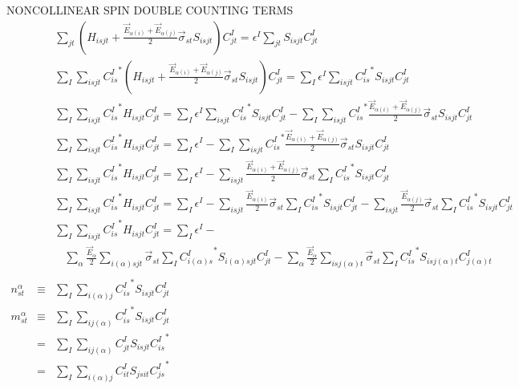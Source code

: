 \documentclass{article}
\begin{document}
NONCOLLINEAR SPIN DOUBLE COUNTING TERMS
\begin{eqnarray*}
&&  \sum_{jt} \left( H_{isjt} +
    \frac{\vec{E}_{\alpha(i)} + \vec{E}_{\alpha(j)} }{2} \vec{\sigma}_{st} S_{isjt} \right) {C^I_{jt}} = 
    \epsilon^I \sum_{jt} S_{isjt} {C^I_{jt}} \\
&&  \sum_I \sum_{isjt} {C^I_{is}}^* \left( H_{isjt} +
    \frac{\vec{E}_{\alpha(i)} + \vec{E}_{\alpha(j)} }{2} \vec{\sigma}_{st} S_{isjt} \right) {C^I_{jt}} = 
    \sum_I \epsilon^I \sum_{isjt} {C^I_{is}}^* S_{isjt} {C^I_{jt}} \\
&&  \sum_I \sum_{isjt} {C^I_{is}}^* H_{isjt} C^I_{jt} =
    \sum_I \epsilon^I \sum_{isjt} {C^I_{is}}^* S_{isjt} {C^I_{jt}} - 
    \sum_I \sum_{isjt} {C^I_{is}}^* \frac{\vec{E}_{\alpha(i)} + \vec{E}_{\alpha(j)} }{2} \vec{\sigma}_{st} S_{isjt} {C^I_{jt}} \\
&& \sum_I \sum_{isjt} {C^I_{is}}^* H_{isjt} C^I_{jt} =
    \sum_I \epsilon^I -
    \sum_I \sum_{isjt} {C^I_{is}}^* \frac{\vec{E}_{\alpha(i)} + \vec{E}_{\alpha(j)} }{2} \vec{\sigma}_{st} S_{isjt} {C^I_{jt}} \\
&& \sum_I \sum_{isjt} {C^I_{is}}^* H_{isjt} C^I_{jt} =
    \sum_I \epsilon^I -
    \sum_{isjt} \frac{\vec{E}_{\alpha(i)} + \vec{E}_{\alpha(j)} }{2} \vec{\sigma}_{st} \sum_I {C^I_{is}}^* S_{isjt} {C^I_{jt}} \\
&& \sum_I \sum_{isjt} {C^I_{is}}^* H_{isjt} C^I_{jt} =
    \sum_I \epsilon^I -
    \sum_{isjt} \frac{\vec{E}_{\alpha(i)}}{2} \vec{\sigma}_{st} \sum_I {C^I_{is}}^* S_{isjt} {C^I_{jt}} -
    \sum_{isjt} \frac{\vec{E}_{\alpha(j)}}{2} \vec{\sigma}_{st} \sum_I {C^I_{is}}^* S_{isjt} {C^I_{jt}} \\
&& \sum_I \sum_{isjt} {C^I_{is}}^* H_{isjt} C^I_{jt} =
    \sum_I \epsilon^I - \\
&& \ \ \ \ 
    \sum_\alpha \frac{\vec{E}_{\alpha}}{2} \sum_{i(\alpha)sjt} \vec{\sigma}_{st} \sum_I {C^I_{i(\alpha)s}}^* S_{i(\alpha)sjt} {C^I_{jt}} -
    \sum_\alpha \frac{\vec{E}_{\alpha}}{2} \sum_{isj(\alpha)t} \vec{\sigma}_{st} \sum_I {C^I_{is}}^* S_{isj(\alpha)t} {C^I_{j(\alpha)t}} \\
\\
n^\alpha_{st} &  \equiv & \sum_I \sum_{i(\alpha)j} {C^I_{is}}^* S_{isjt} C^I_{jt} \\
m^\alpha_{st} &  \equiv & \sum_I \sum_{ij(\alpha)} {C^I_{is}}^* S_{isjt} C^I_{jt} \\
 &  = & \sum_I \sum_{ij(\alpha)} C^I_{jt} S_{isjt} {C^I_{is}}^* \\
 &  = & \sum_I \sum_{i(\alpha)j} C^I_{it} S_{jsit} {C^I_{js}}^* \\

\end{eqnarray*}
\end{document}
